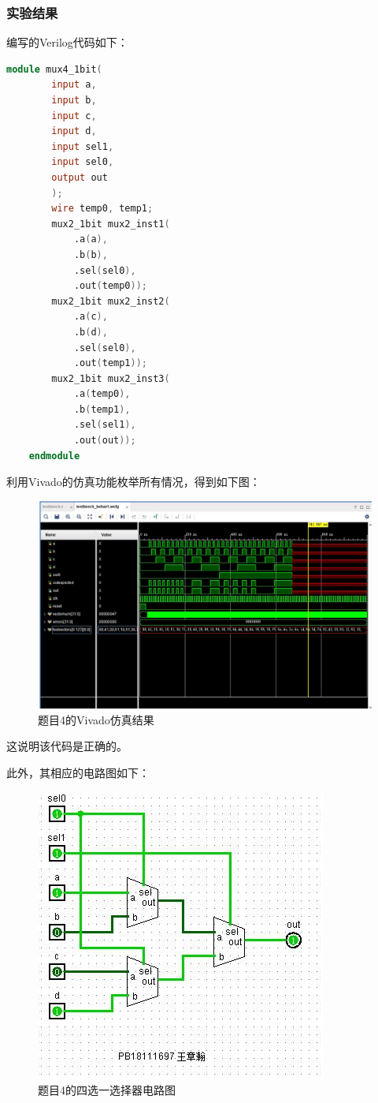 \documentclass[UTF8]{article}
\begin{document}
	\subsubsection{实验结果}
	编写的Verilog代码如下：\par
	\begin{lstlisting}[language=Verilog]
	module mux4_1bit(
		input a,
		input b,
		input c,
		input d,
		input sel1,
		input sel0,
		output out
		);
		wire temp0, temp1;
		mux2_1bit mux2_inst1(
			.a(a),
			.b(b),
			.sel(sel0),
			.out(temp0));
		mux2_1bit mux2_inst2(
			.a(c),
			.b(d),
			.sel(sel0),
			.out(temp1));
		mux2_1bit mux2_inst3(
			.a(temp0),
			.b(temp1),
			.sel(sel1),
			.out(out));
	endmodule
	\end{lstlisting}\par
	利用Vivado的仿真功能枚举所有情况，得到如下图：\par
	\begin{figure}[H]
		\centering
		\includegraphics[scale=0.5]{Problem4_Mux4_1bit_Simulation.jpg}
		\caption{题目4的Vivado仿真结果}
		\label{Problem4_Mux4_1bit_Simulation}
	\end{figure}\par
	这说明该代码是正确的。\par
	此外，其相应的电路图如下：
	\begin{figure}[H]
		\centering
		\includegraphics[scale=1]{Problem3_Mux4_1bit.jpg}
		\caption{题目4的四选一选择器电路图}
		\label{Problem3_Mux4_1bit}
	\end{figure}\par
\end{document}
